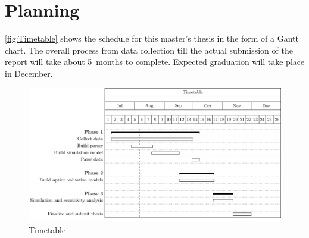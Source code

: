 \chapter{Planning}
\autoref{fig:Timetable} shows the schedule for this master's thesis in the form of a Gantt chart. The overall process from data collection till the actual submission of the report will take about 5~months to complete. Expected graduation will take place in December.

\begin{figure}[h]
\centering
\includegraphics[width=1\textwidth]{figures/Timetable}
\caption{Timetable}
\label{fig:Timetable}
\end{figure}